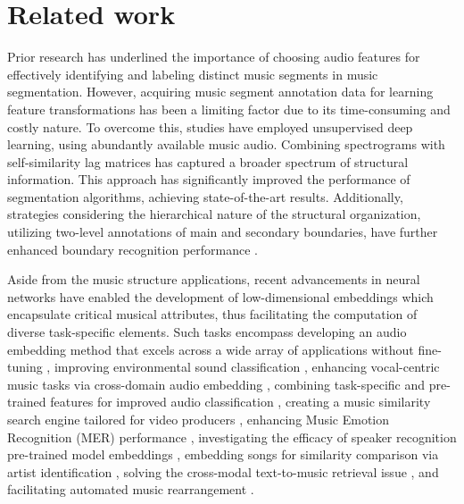 \section{Related work}

Prior research has underlined the importance of choosing audio features for effectively identifying and labeling distinct music segments in music segmentation. However, acquiring music segment annotation data for learning feature transformations has been a limiting factor due to its time-consuming and costly nature. To overcome this, studies have employed unsupervised deep learning, using abundantly available music audio. Combining spectrograms with self-similarity lag matrices has captured a broader spectrum of structural information. This approach has significantly improved the performance of segmentation algorithms, achieving state-of-the-art results. Additionally, strategies considering the hierarchical nature of the structural organization, utilizing two-level annotations of main and secondary boundaries, have further enhanced boundary recognition performance \cite{unsupervisedlearndeepfeat, GrillMUSICANNOTATIONS, Hernandez-Olivan2021MusicFeatures, SalamonDeepSegmentation}.

Aside from the music structure applications, recent advancements in neural networks have enabled the development of low-dimensional embeddings which encapsulate critical musical attributes, thus facilitating the computation of diverse task-specific elements. Such tasks encompass developing an audio embedding method that excels across a wide array of applications without fine-tuning \cite{Turian2022HEAR:Representations}, improving environmental \cite{Kim2020OneStrategies} sound classification \cite{CramerLOOKEMBEDDINGS}, enhancing vocal-centric music tasks via cross-domain audio embedding \cite{Kim2021LearningLoss}, combining task-specific and pre-trained features for improved audio classification \cite{Hung2022Feature-informedClassification}, creating a music similarity search engine tailored for video producers \cite{epidemic}, enhancing Music Emotion Recognition (MER) performance \cite{KohComparisonRecognition}, investigating the efficacy of speaker recognition pre-trained model embeddings \cite{lightweight}, embedding songs for similarity comparison via artist identification \cite{contentmusicsimtriplet2020}, solving the cross-modal text-to-music retrieval issue \cite{WonEmotionStories}, and facilitating automated music rearrangement \cite{Stoller2018IntuitiveTransitions, Plachouras2023MusicSegmentation}.

